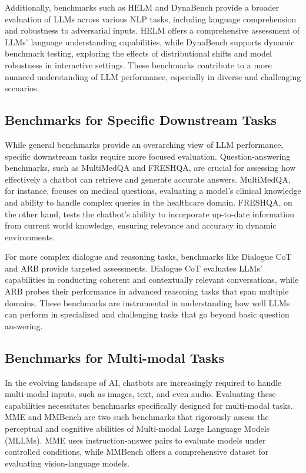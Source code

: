 Additionally, benchmarks such as HELM and DynaBench provide a broader evaluation of LLMs across various NLP tasks, including language comprehension and robustness to adversarial inputs. HELM offers a comprehensive assessment of LLMs' language understanding capabilities, while DynaBench supports dynamic benchmark testing, exploring the effects of distributional shifts and model robustness in interactive settings. These benchmarks contribute to a more nuanced understanding of LLM performance, especially in diverse and challenging scenarios.

\subsection{Benchmarks for Specific Downstream Tasks}

While general benchmarks provide an overarching view of LLM performance, specific downstream tasks require more focused evaluation. Question-answering benchmarks, such as MultiMedQA and FRESHQA, are crucial for assessing how effectively a chatbot can retrieve and generate accurate answers. MultiMedQA, for instance, focuses on medical questions, evaluating a model's clinical knowledge and ability to handle complex queries in the healthcare domain. FRESHQA, on the other hand, tests the chatbot's ability to incorporate up-to-date information from current world knowledge, ensuring relevance and accuracy in dynamic environments.

For more complex dialogue and reasoning tasks, benchmarks like Dialogue CoT and ARB provide targeted assessments. Dialogue CoT evaluates LLMs' capabilities in conducting coherent and contextually relevant conversations, while ARB probes their performance in advanced reasoning tasks that span multiple domains. These benchmarks are instrumental in understanding how well LLMs can perform in specialized and challenging tasks that go beyond basic question answering.

\subsection{Benchmarks for Multi-modal Tasks}

In the evolving landscape of AI, chatbots are increasingly required to handle multi-modal inputs, such as images, text, and even audio. Evaluating these capabilities necessitates benchmarks specifically designed for multi-modal tasks. MME and MMBench are two such benchmarks that rigorously assess the perceptual and cognitive abilities of Multi-modal Large Language Models (MLLMs). MME uses instruction-answer pairs to evaluate models under controlled conditions, while MMBench offers a comprehensive dataset for evaluating vision-language models.

